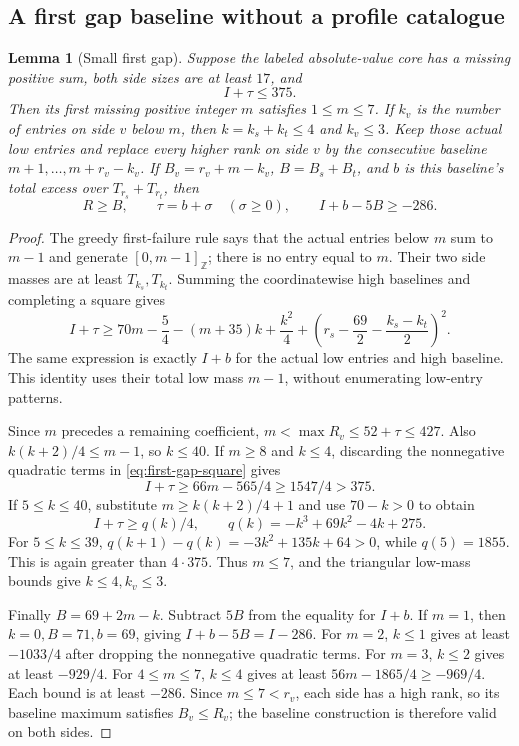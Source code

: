\documentclass[11pt,letterpaper]{article}
\newcommand{\Z}{\mathbb Z}\newcommand{\R}{\mathbb R}
\newtheorem{lemma}[theorem]{Lemma}
\theoremstyle{definition}\newtheorem{definition}[theorem]{Definition}
\begin{document}
\subsection{A first gap baseline without a profile catalogue}
\begin{lemma}[Small first gap]\label{lem:first-gap-seven}
Suppose the labeled absolute-value core has a missing positive sum, both side sizes are at least $17$, and
\[
I+\tau\le375.
\]
Then its first missing positive integer $m$ satisfies $1\le m\le7$. If $k_v$ is the number of entries on side $v$ below $m$, then $k=k_s+k_t\le4$ and $k_v\le3$. Keep those actual low entries and replace every higher rank on side $v$ by the consecutive baseline $m+1,\ldots,m+r_v-k_v$. If $B_v=r_v+m-k_v$, $B=B_s+B_t$, and $b$ is this baseline's total excess over $T_{r_s}+T_{r_t}$, then
\begin{equation}\label{eq:baseline-286}
R\ge B,\qquad \tau=b+\sigma\quad(\sigma\ge0),\qquad I+b-5B\ge-286.
\end{equation}
\end{lemma}
\begin{proof}
The greedy first-failure rule says that the actual entries below $m$ sum to $m-1$ and generate $[0,m-1]_{\Z}$; there is no entry equal to $m$. Their two side masses are at least $T_{k_s},T_{k_t}$. Summing the coordinatewise high baselines and completing a square gives
\begin{equation}\label{eq:first-gap-square}
I+\tau\ge70m-\frac54-(m+35)k+\frac{k^2}{4}
 +\left(r_s-\frac{69}{2}-\frac{k_s-k_t}{2}\right)^2.
\end{equation}
The same expression is exactly $I+b$ for the actual low entries and high baseline. This identity uses their total low mass $m-1$, without enumerating low-entry patterns.

Since $m$ precedes a remaining coefficient, $m<\max R_v\le52+\tau\le427$. Also $k(k+2)/4\le m-1$, so $k\le40$. If $m\ge8$ and $k\le4$, discarding the nonnegative quadratic terms in \eqref{eq:first-gap-square} gives
\[
I+\tau\ge66m-565/4\ge1547/4>375.
\]
If $5\le k\le40$, substitute $m\ge k(k+2)/4+1$ and use $70-k>0$ to obtain
\[
I+\tau\ge q(k)/4,\qquad q(k)=-k^3+69k^2-4k+275.
\]
For $5\le k\le39$, $q(k+1)-q(k)=-3k^2+135k+64>0$, while $q(5)=1855$. This is again greater than $4\cdot375$. Thus $m\le7$, and the triangular low-mass bounds give $k\le4,k_v\le3$.

Finally $B=69+2m-k$. Subtract $5B$ from the equality for $I+b$. If $m=1$, then $k=0,B=71,b=69$, giving $I+b-5B=I-286$. For $m=2$, $k\le1$ gives at least $-1033/4$ after dropping the nonnegative quadratic terms. For $m=3$, $k\le2$ gives at least $-929/4$. For $4\le m\le7$, $k\le4$ gives at least $56m-1865/4\ge-969/4$. Each bound is at least $-286$. Since $m\le7<r_v$, each side has a high rank, so its baseline maximum satisfies $B_v\le R_v$; the baseline construction is therefore valid on both sides.
\end{proof}
\end{document}
